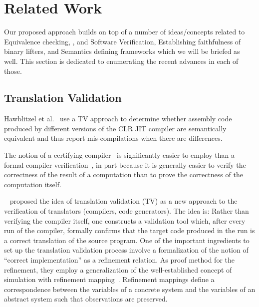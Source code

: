\chapter{Related Work}\label{sec:related-work}
Our proposed approach builds on top of a number of ideas/concepts related to
Equivalence checking, \TV, and Software Verification, Establishing faithfulness
of binary lifters, and Semantics defining frameworks which we will be briefed as well.
This section is dedicated to enumerating the recent advances in each of those.

\section{Translation Validation}

Hawblitzel et al.~\cite{Hawblitzel:FSE2013} use a TV approach to determine
whether assembly code produced by different versions of the CLR JIT compiler
are semantically equivalent and thus report mis-compilations when there are
differences.

The notion of a certifying
compiler~\cite{Necula:2000,Pnueli:1998,Stepp:2011,Tristan:2011} is
significantly easier to employ than a formal compiler
verification~\cite{Leroy:2009}, in part because it is generally easier to
verify the correctness of the result of a computation than to prove the
correctness of the computation itself. 

~\cite{Pnueli:1998} proposed the idea of translation validation (TV) as a new
approach to the verification of translators (compilers, code generators). The
idea is: Rather than verifying the compiler itself, one constructs a validation
tool which, after every run of the compiler, formally confirms that the target
code produced in the run is a correct translation of the source program. One of
the important ingredients  to set up the  translation validation process
involve a formalization of the notion of ``correct implementation'' as a
refinement relation. As proof method for the refinement, they employ a
generalization of the well-established concept of simulation with refinement
mapping~\cite{Abadi:1991}. Refinement mappings define a correspondence between
the variables of a concrete system and the variables of an abstract system such
that observations are preserved. 

